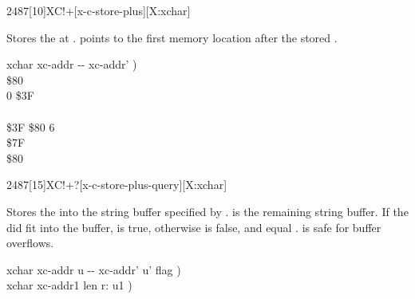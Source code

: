 \begin{worddef}{2487}[10]{XC!+}[x-c-store-plus][X:xchar]
\item {}

	Stores the  at .  
	points to the first memory location after the stored .

	\begin{implement}
	\word{:}   xchar xc-addr -{}- xc-addr' ) \\
	\tab {} \$80          \\
	\tab {} 0  \$3F \\
	\tab {}    \\
	\tab[2]    \$3F  \$80   6   \\
	\tab {} \$7F     \\
	\tab {}  \$80         \\
	\word{;}
	\end{implement}
\end{worddef}


\begin{worddef}[XC!+q]{2487}[15]{XC!+?}[x-c-store-plus-query][X:xchar]
\item {}

	Stores the  into the string buffer specified by
	.   is the remaining string
	buffer.  If the  did fit into the buffer, \param{flag}
	is true, otherwise  is false, and \param{xc-addr_2 u_2}
	equal .   is safe for buffer overflows.

	\begin{implement}
	\word{:}   xchar xc-addr u -{}- xc-addr' u' flag ) \\
	\tab {}        xchar xc-addr1 len r: u1 ) \\
	\tab[2]   \\
	\tab[2]     \\
	\tab {} \\
	\tab[2]      \word{-}  \\
	\tab {} \word{;}
	\end{implement}

	\begin{testing}
	\end{testing}
\end{worddef}


